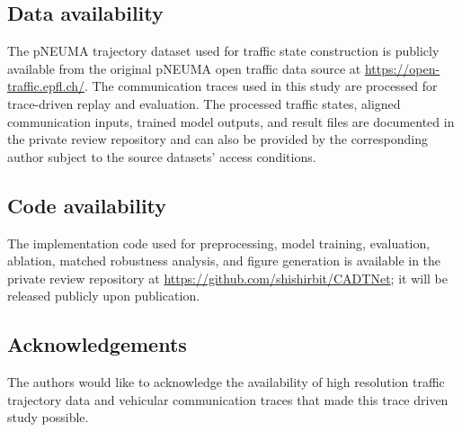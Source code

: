 \documentclass[pdflatex,sn-mathphys-num]{sn-jnl}%
\theoremstyle{thmstyleone}%
\theoremstyle{thmstyletwo}%
\theoremstyle{thmstylethree}%
\begin{document}
\subsection*{Data availability}

The pNEUMA trajectory dataset used for traffic state construction is publicly available from the original pNEUMA open traffic data source at \url{https://open-traffic.epfl.ch/}. The communication traces used in this study are processed for trace-driven replay and evaluation. The processed traffic states, aligned communication inputs, trained model outputs, and result files are documented in the private review repository and can also be provided by the corresponding author subject to the source datasets' access conditions.

\subsection*{Code availability}

The implementation code used for preprocessing, model training, evaluation, ablation, matched robustness analysis, and figure generation is available in the private review repository at \url{https://github.com/shishirbit/CADTNet}; it will be released publicly upon publication.

\subsection*{Acknowledgements}

The authors would like to acknowledge the availability of high resolution traffic trajectory data and vehicular communication traces that made this trace driven study possible.

\end{document}
